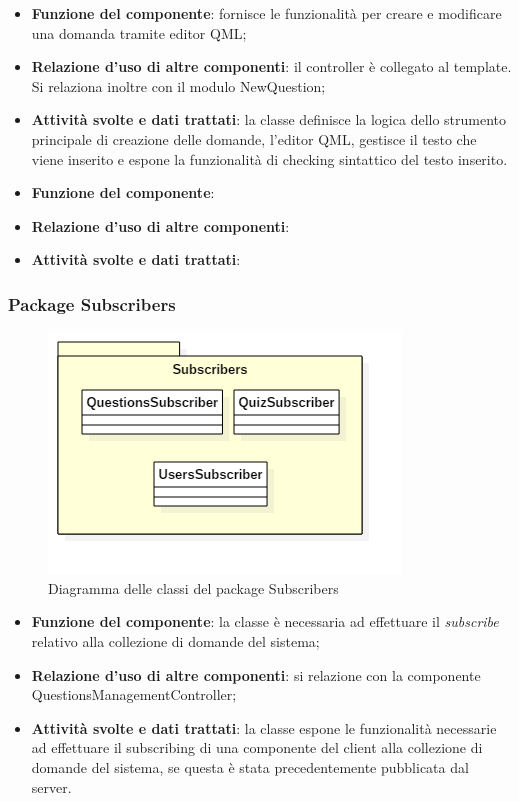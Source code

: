 \begin{itemize}
	\item\textbf{Funzione del componente}: fornisce le funzionalità per creare e modificare una domanda tramite editor QML;
	\item\textbf{Relazione d'uso di altre componenti}: il controller è collegato al template. Si relaziona inoltre con il modulo NewQuestion;
	\item\textbf{Attività svolte e dati trattati}: la classe definisce la logica dello strumento principale di creazione delle domande, l'editor QML, gestisce il testo che viene inserito e espone la funzionalità di checking sintattico del testo inserito.
\end{itemize}


\begin{itemize}
	\item\textbf{Funzione del componente}: 
	\item\textbf{Relazione d'uso di altre componenti}: 
	\item\textbf{Attività svolte e dati trattati}:
\end{itemize}

\subsubsection{Package Subscribers}
\begin{figure}[h!]
\begin{center}
	\includegraphics[scale=0.65]{../images/SubscribersClass.png}
	\caption{Diagramma delle classi del package Subscribers}
\end{center}
\end{figure}


\begin{itemize}
	\item\textbf{Funzione del componente}: la classe è necessaria ad effettuare il \emph{subscribe} relativo alla collezione di domande del sistema;
	\item\textbf{Relazione d'uso di altre componenti}: si relazione con la componente QuestionsManagementController;
	\item\textbf{Attività svolte e dati trattati}: la classe espone le funzionalità necessarie ad effettuare il subscribing di una componente del client alla collezione di domande del sistema, se questa è stata precedentemente pubblicata dal server.
\end{itemize}

